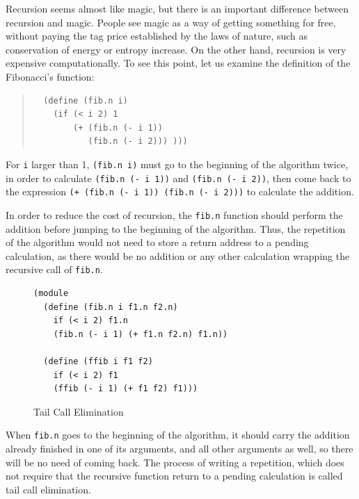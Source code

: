 \documentclass[a4paper,12pt]{book}
\begin{document}
Recursion seems almost like magic, but there
is an important difference between recursion
and magic. People see magic as a way of getting
something for free, without paying the tag price
established by the laws of nature, such as 
conservation of energy or entropy increase.
On the other hand, recursion is very expensive
computationally. To see this point, let us examine
the definition of the Fibonacci's function:
\begin{quote}
\begin{verbatim}
  (define (fib.n i)
    (if (< i 2) 1
        (+ (fib.n (- i 1))
           (fib.n (- i 2))) )))
\end{verbatim}
\end{quote}
For \verb|i| larger than 1, \verb|(fib.n i)| must
go to the beginning of the algorithm twice,
in order to calculate \verb|(fib.n (- i 1))|
and \verb|(fib.n (- i 2))|, then come back
to the expression
\verb|(+ (fib.n (- i 1)) (fib.n (- i 2)))|
to calculate the addition.

In order to reduce the cost of recursion, the
\verb|fib.n| function should perform the addition
before jumping to the beginning of the algorithm.
Thus, the repetition of the
algorithm would not need to store a return address
to a pending calculation, as there would be no addition
or any other calculation wrapping the recursive
call of \verb|fib.n|. 

\begin{figure}[!h]
\begin{verbatim}
(module
  (define (fib.n i f1.n f2.n)
    if (< i 2) f1.n
    (fib.n (- i 1) (+ f1.n f2.n) f1.n))

  (define (ffib i f1 f2)
    if (< i 2) f1
    (ffib (- i 1) (+ f1 f2) f1)))
\end{verbatim}
  \caption{Tail Call Elimination}
  \label{wasm:tailcall}
\end{figure}


When \verb|fib.n| goes to the
beginning of the algorithm, it should carry the
addition already finished in one of its arguments,
and all other arguments as well,
so there will be no need of coming back.
The process of writing a repetition, which does not
require that the recursive function return to
a pending calculation is called tail call elimination.
\end{document}
